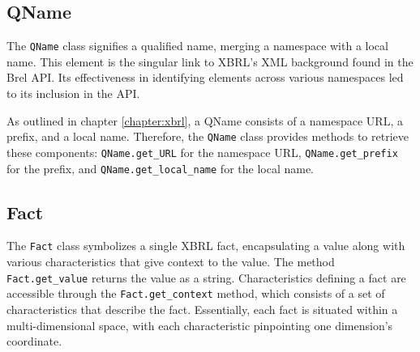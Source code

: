\subsection{QName}
\label{subsec:qname}

The \texttt{QName} class signifies a qualified name, merging a namespace with a local name.  
This element is the singular link to XBRL's XML background found in the Brel API.  
Its effectiveness in identifying elements across various namespaces led to its inclusion in the API.  

As outlined in chapter \ref{chapter:xbrl}, a QName consists of a namespace URL, a prefix, and a local name.  
Therefore, the \texttt{QName} class provides methods to retrieve these components:  
\texttt{QName.get\_URL} for the namespace URL, \texttt{QName.get\_prefix} for the prefix, and \texttt{QName.get\_local\_name} for the local name.

\subsection{Fact}
\label{subsec:fact}

The \texttt{Fact} class symbolizes a single XBRL fact, encapsulating a value along with various characteristics that give context to the value.
The method \texttt{Fact.get\_value} returns the value as a string.
Characteristics defining a fact are accessible through the \texttt{Fact.get\_context} method, which consists of a set of characteristics that describe the fact.
Essentially, each fact is situated within a multi-dimensional space, with each characteristic pinpointing one dimension's coordinate.


